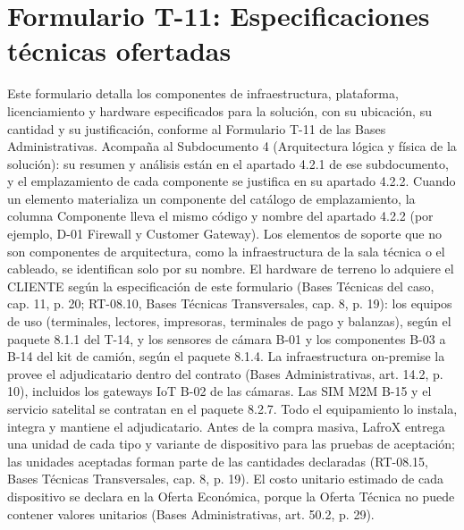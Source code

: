 
\chapter*{Formulario T-11: Especificaciones técnicas ofertadas}
\label{fuente-15-anexo-t11}

Este formulario detalla los componentes de infraestructura, plataforma, licenciamiento y hardware especificados para la solución, con su ubicación, su cantidad y su justificación, conforme al Formulario T-11 de las Bases Administrativas. Acompaña al Subdocumento 4 (Arquitectura lógica y física de la solución): su resumen y análisis están en el apartado 4.2.1 de ese subdocumento, y el emplazamiento de cada componente se justifica en su apartado 4.2.2. Cuando un elemento materializa un componente del catálogo de emplazamiento, la columna Componente lleva el mismo código y nombre del apartado 4.2.2 (por ejemplo, D-01 Firewall y Customer Gateway). Los elementos de soporte que no son componentes de arquitectura, como la infraestructura de la sala técnica o el cableado, se identifican solo por su nombre. El hardware de terreno lo adquiere el CLIENTE según la especificación de este formulario (Bases Técnicas del caso, cap. 11, p. 20; RT-08.10, Bases Técnicas Transversales, cap. 8, p. 19): los equipos de uso (terminales, lectores, impresoras, terminales de pago y balanzas), según el paquete 8.1.1 del T-14, y los sensores de cámara B-01 y los componentes B-03 a B-14 del kit de camión, según el paquete 8.1.4. La infraestructura on-premise la provee el adjudicatario dentro del contrato (Bases Administrativas, art. 14.2, p. 10), incluidos los gateways IoT B-02 de las cámaras. Las SIM M2M B-15 y el servicio satelital se contratan en el paquete 8.2.7. Todo el equipamiento lo instala, integra y mantiene el adjudicatario. Antes de la compra masiva, LafroX entrega una unidad de cada tipo y variante de dispositivo para las pruebas de aceptación; las unidades aceptadas forman parte de las cantidades declaradas (RT-08.15, Bases Técnicas Transversales, cap. 8, p. 19). El costo unitario estimado de cada dispositivo se declara en la Oferta Económica, porque la Oferta Técnica no puede contener valores unitarios (Bases Administrativas, art. 50.2, p. 29).

